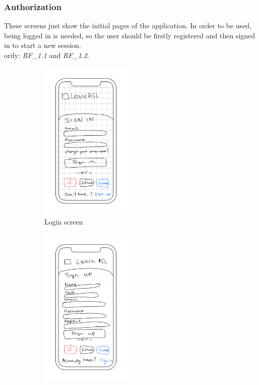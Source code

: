 \subsubsection{Authorization}
These screens just show the initial pages of the application. In order to be used, being logged in is needed, so the user should be firstly registered and then signed in to start a new session.\\

orify: \textit{RF\_1.1} and \textit{RF\_1.2}. \\
\begin{figure}[H]
    \centering
    \begin{subfigure}[T]{0.49\textwidth}
        \centering
        \includegraphics[width=0.48\textwidth]{assets/screens/auth/Login.png}
        \caption{Login screen}
        \label{fig:design_screen_login}
    \end{subfigure}
    \hfill
    \begin{subfigure}[T]{0.49\textwidth}
        \centering
        \includegraphics[width=0.48\textwidth]{assets/screens/auth/Register.png}

\end{subfigure}
\end{figure}
